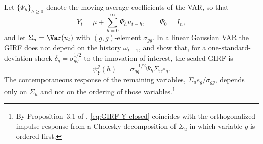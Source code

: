 Let $\{\Psi_h\}_{h \ge 0}$ denote the moving-average coefficients of the VAR, so
that
\begin{equation}
    Y_t = \mu + \sum_{h=0}^\infty \Psi_h u_{t-h}, \qquad \Psi_0 = I_n,
\end{equation}
and let $\Sigma_u = \Var(u_t)$ with $(g,g)$-element $\sigma_{gg}$. In a linear
Gaussian VAR the GIRF does not depend on the history $\omega_{t-1}$, and
\citet{pesaranShin1998} show that, for a one-standard-deviation shock $\delta_g =
\sigma_{gg}^{1/2}$ to the innovation of interest, the scaled GIRF is
\begin{equation}
    \psi_Y^g(h)
    \;=\; \sigma_{gg}^{-1/2} \Psi_h \Sigma_u e_g.
    \label{eq:GIRF-Y-closed}
\end{equation}
The contemporaneous response of the remaining variables, $\Sigma_u
e_g/\sigma_{gg}$, depends only on $\Sigma_u$ and not on the ordering of those
variables.\footnote{By Proposition~3.1 of \citet{pesaranShin1998},
\eqref{eq:GIRF-Y-closed} coincides with the orthogonalized impulse response from
a Cholesky decomposition of $\Sigma_u$ in which variable $g$ is ordered first.}
